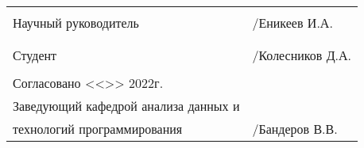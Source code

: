 \documentclass[a4paper]{article}
\begin{document}
    \vfill

    \begin{xltabular}{\textwidth} {
            >{\hsize} X
            >{\hsize} X }
         \\
        Научный руководитель & \underline{\hspace{3cm}}/Еникеев И.А. \\
        & \\
         \\
        Студент & \underline{\hspace{3cm}}/Колесников Д.А. \\
        & \\
        Согласовано <<\underline{\hspace{1cm}}>>\underline{\hspace{3cm}} 2022г. & \\
        Заведующий кафедрой анализа данных и & \\
        технологий программирования & \underline{\hspace{3cm}}/Бандеров В.В. \\
    \end{xltabular}
\end{document}
